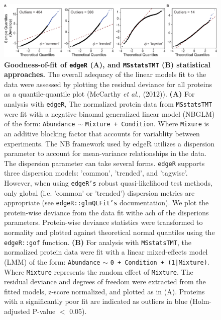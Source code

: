 \documentclass[11pt]{elife}\usepackage[]{graphicx}\usepackage[]{color}
\begin{document}
\begin{figure}[hb!]
	\begin{fullwidth}
		\begin{center}
		\includegraphics[width=0.9\paperwidth,keepaspectratio]{gof}
		\caption{\textbf{Goodness-of-fit of \texttt{edgeR} (A), and 
		\texttt{MSstatsTMT} (B) statistical approaches.} The overall
		adequacy of the linear models fit to the data were assessed 
		by plotting the residual deviance for all proteins as a 
		quantile-quantile plot (McCarthy \textit{et al.}, (2012)). 
		\textbf{(A)} For analysis with \texttt{edgeR}, The normalized
		protein data from \texttt{MSstatsTMT} were fit with a negative
		binomal generalized linear model (NBGLM) of the form: 
		\texttt{Abundance} $\sim$ \texttt{Mixture + Condition}.
		Where \texttt{Mixure} is an additive blocking factor that 
		accounts for variablity between experiments. 
		The NB framework used by edgeR utilizes a dispersion parameter 
		to account for mean-variance relationships in the data.
		The dispersion parameter can take several forms. 
                \texttt{edgeR} supports three dispersion models: 'common',
		'trended', and 'tagwise'. However, when using \texttt{edgeR's}
		robust quasi-likelihood test methods, only global (i.e. 'common'
		or 'trended') dispersion metrics are appropriate 
		(see \texttt{edgeR::glmQLFit's} documentation). 
		We plot the protein-wise deviance from the data fit withe ach of
		the disperions parameters. Protein-wise deviance
		statistics were transformed to normality and plotted against
		theoretical normal quantiles using the \texttt{edgeR::gof}
		function. \textbf{(B)} For analysis with \texttt{MSstatsTMT},
		the normalized protein data were fit with a linear mixed-effects 
		model (LMM) of the form: 
		\texttt{Abundance} $\sim$ \texttt{0 + Condition + (1|Mixture)}. 
		Where \texttt{Mixture} represents the random effect
		of \texttt{Mixture}. The residual deviance and degrees of 
		freedom were extracted from the fitted models, z-score
		normalized, and plotted as in (A). Proteins with a significantly 
		poor fit are indicated as outliers in blue 
		(Holm-adjusted P-value $<$ 0.05).}
		\label{fig:gof}
	\end{center}
	\end{fullwidth}
\end{figure}
\end{document}
